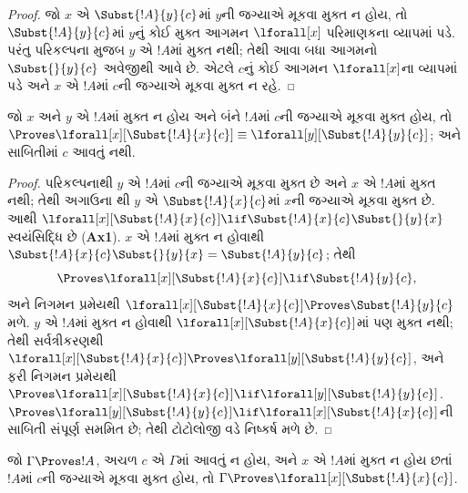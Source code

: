 \begin{proof} જો $x$ એ
$\Subst{!A}{y}{c}$માં
$y$ની જગ્યાએ મૂકવા
મુક્ત ન હોય,
તો $\Subst{!A}{y}{c}$માં
$y$નું કોઈ મુક્ત આગમન
$\lforall[x]$ પરિમાણકના
વ્યાપમાં પડે. પરંતુ
પરિકલ્પના મુજબ $y$
એ $!A$માં મુક્ત નથી;
તેથી આવા બધા આગમનો
$\Subst{}{y}{c}$ અવેજીથી
આવે છે. એટલે $c$નું
કોઈ આગમન $\lforall[x]$ના
વ્યાપમાં પડે અને $x$
એ $!A$માં $c$ની
જગ્યાએ મૂકવા
મુક્ત ન રહે.
\end{proof}

\begin{lem}[બંધ ચલનું પરિવર્તન]
જો $x$ અને $y$ એ $!A$માં મુક્ત
ન હોય અને બંને $!A$માં $c$ની
જગ્યાએ મૂકવા મુક્ત
હોય, તો $\Proves \lforall[x][\Subst{!A}{x}{c}] \equiv
\lforall[y][\Subst{!A}{y}{c}]$;
અને સાબિતીમાં $c$ આવતું નથી.
\end{lem}

\begin{proof}
પરિકલ્પનાથી $y$ એ $!A$માં
$c$ની જગ્યાએ મૂકવા મુક્ત
છે અને $x$ એ $!A$માં મુક્ત
નથી; તેથી અગાઉના
થી $y$ એ
$\Subst{!A}{x}{c}$માં
$x$ની જગ્યાએ મૂકવા
મુક્ત છે. આથી
$\lforall[x][\Subst{!A}{x}{c}] \lif \Subst{!A}{x}{c} \Subst{}{y}{x}$
સ્વયંસિદ્ધિ છે (\textbf{Ax1}).
$x$ એ $!A$માં મુક્ત
ન હોવાથી
$\Subst{!A}{x}{c} \Subst{}{y}{x} = \Subst{!A}{y}{c}$;
તેથી
\[
\Proves \lforall[x][\Subst{!A}{x}{c}] \lif \Subst{!A}{y}{c}, 
\] 
અને નિગમન પ્રમેયથી
$\lforall[x][\Subst{!A}{x}{c}] \Proves
\Subst{!A}{y}{c}$ મળે.
$y$ એ $!A$માં મુક્ત
ન હોવાથી
$\lforall[x][\Subst{!A}{x}{c}]$માં
પણ મુક્ત નથી; તેથી
સર્વત્રીકરણથી
$\lforall[x][\Subst{!A}{x}{c}] \Proves \lforall[y][\Subst{!A}{y}{c}]$,
અને ફરી નિગમન
પ્રમેયથી $\Proves
\lforall[x][\Subst{!A}{x}{c}] \lif \lforall[y][\Subst{!A}{y}{c}]$.
$\Proves \lforall[y][\Subst{!A}{y}{c}] \lif \lforall[x]
[\Subst{!A}{x}{c}]$ની
સાબિતી સંપૂર્ણ
સમમિત છે; તેથી
ટોટોલોજી વડે
નિષ્કર્ષ મળે છે.
\end{proof}

\begin{thm}
જો $\Gamma \Proves !A$, અચળ
$c$ એ $\Gamma$માં આવતું ન હોય,
અને $x$ એ $!A$માં મુક્ત
ન હોય છતાં $!A$માં
$c$ની જગ્યાએ મૂકવા
મુક્ત હોય, તો
$\Gamma \Proves \lforall[x][\Subst{!A}{x}{c}]$.
\end{thm}

